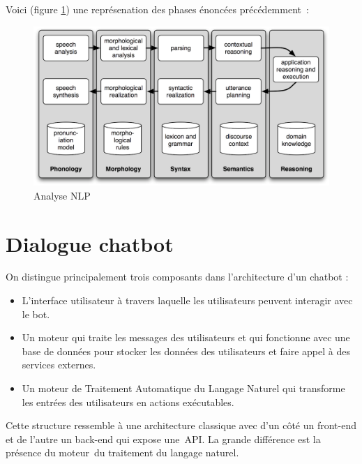 \vspace{1em}

Voici (figure \ref{fig:Analyse NLP}) une représenation des phases énoncées précédemment :

\begin{figure}[H]
	\centering
		\includegraphics[width = \textwidth]{analyseDetaillee.png}
	\caption{Analyse NLP}
	\label{fig:Analyse NLP}
\end{figure}


\section{Dialogue chatbot}

On distingue principalement trois composants dans l’architecture d’un chatbot :
\vspace{1em}

\begin{itemize}
	\item L’interface utilisateur à travers laquelle les utilisateurs peuvent interagir avec le bot. 
	\item Un moteur qui traite les messages des utilisateurs et qui fonctionne avec une base de données pour stocker les données des utilisateurs et faire  appel à des services externes.
	\item Un moteur de Traitement Automatique du Langage Naturel qui transforme les entrées des utilisateurs en actions exécutables.
\end{itemize}
\vspace{1em}

Cette structure ressemble à  une architecture classique avec d’un côté un front-end et de l’autre un back-end qui expose une API. La grande différence est la présence du moteur du traitement du langage naturel.
\vspace{1em}

